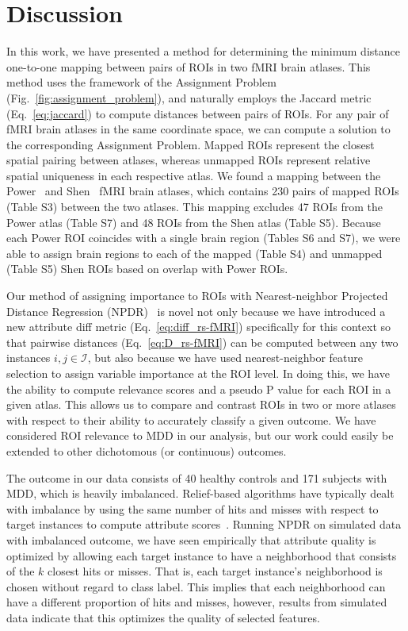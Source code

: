 \documentclass[10pt,letterpaper]{article}\usepackage[]{graphicx}\usepackage[]{color}
\begin{document}
\section{Discussion}
In this work, we have presented a method for determining the minimum distance one-to-one mapping between pairs of ROIs in two fMRI brain atlases. This method uses the framework of the Assignment Problem (Fig.~\ref{fig:assignment_problem}), and naturally employs the Jaccard metric (Eq.~\ref{eq:jaccard}) to compute distances between pairs of ROIs. For any pair of fMRI brain atlases in the same coordinate space, we can compute a solution to the corresponding Assignment Problem. Mapped ROIs represent the closest spatial pairing between atlases, whereas unmapped ROIs represent relative spatial uniqueness in each respective atlas. We found a mapping between the Power~\cite{power2011} and Shen~\cite{shen2013} fMRI brain atlases, which contains 230 pairs of mapped ROIs (Table S3) between the two atlases. This mapping excludes 47 ROIs from the Power atlas (Table S7) and 48 ROIs from the Shen atlas (Table S5). Because each Power ROI coincides with a single brain region (Tables S6 and S7), we were able to assign brain regions to each of the mapped (Table S4) and unmapped (Table S5) Shen ROIs based on overlap with Power ROIs. 

Our method of assigning importance to ROIs with Nearest-neighbor Projected Distance Regression (NPDR)~\cite{npdr} is novel not only because we have introduced a new attribute diff metric (Eq.~\ref{eq:diff_rs-fMRI}) specifically for this context so that pairwise distances (Eq.~\ref{eq:D_rs-fMRI}) can be computed between any two instances $i,j \in \mathcal{I}$, but also because we have used nearest-neighbor feature selection to assign variable importance at the ROI level. In doing this, we have the ability to compute relevance scores and a pseudo P value for each ROI in a given atlas. This allows us to compare and contrast ROIs in two or more atlases with respect to their ability to accurately classify a given outcome. We have considered ROI relevance to MDD in our analysis, but our work could easily be extended to other dichotomous (or continuous) outcomes. 

The outcome in our data consists of 40 healthy controls and 171 subjects with MDD, which is heavily imbalanced. Relief-based algorithms have typically dealt with imbalance by using the same number of hits and misses with respect to target instances to compute attribute scores~\cite{urbanowicz17}. Running NPDR on simulated data with imbalanced outcome, we have seen empirically that attribute quality is optimized by allowing each target instance to have a neighborhood that consists of the $k$ closest hits or misses. That is, each target instance's neighborhood is chosen without regard to class label. This implies that each neighborhood can have a different proportion of hits and misses, however, results from simulated data indicate that this optimizes the quality of selected features.
\end{document}
